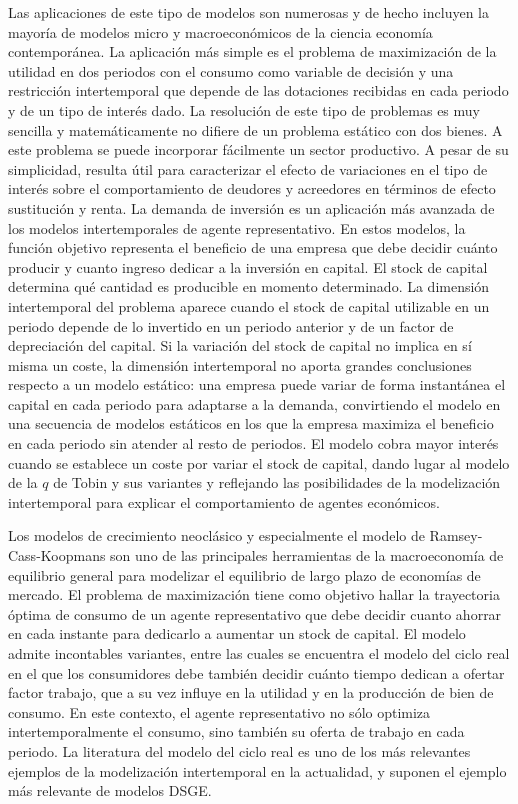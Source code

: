 \documentclass{nuevotema}
\begin{document}
Las aplicaciones de este tipo de modelos son numerosas y de hecho incluyen la mayoría de modelos micro y macroeconómicos de la ciencia economía contemporánea. La aplicación más simple es el problema de maximización de la utilidad en dos periodos con el consumo como variable de decisión y una restricción intertemporal que depende de las dotaciones recibidas en cada periodo y de un tipo de interés dado. La resolución de este tipo de problemas es muy sencilla y matemáticamente no difiere de un problema estático con dos bienes. A este problema se puede incorporar fácilmente un sector productivo. A pesar de su simplicidad, resulta útil para caracterizar el efecto de variaciones en el tipo de interés sobre el comportamiento de deudores y acreedores en términos de efecto sustitución y renta. La demanda de inversión es un aplicación más avanzada de los modelos intertemporales de agente representativo. En estos modelos, la función objetivo representa el beneficio de una empresa que debe decidir cuánto producir y cuanto ingreso dedicar a la inversión en capital. El stock de capital determina qué cantidad es producible en momento determinado. La dimensión intertemporal del problema aparece cuando el stock de capital utilizable en un periodo depende de lo invertido en un periodo anterior y de un factor de depreciación del capital. Si la variación del stock de capital no implica en sí misma un coste, la dimensión intertemporal no aporta grandes conclusiones respecto a un modelo estático: una empresa puede variar de forma instantánea el capital en cada periodo para adaptarse a la demanda, convirtiendo el modelo en una secuencia de modelos estáticos en los que la empresa maximiza el beneficio en cada periodo sin atender al resto de periodos. El modelo cobra mayor interés cuando se establece un coste por variar el stock de capital, dando lugar al modelo de la $q$ de Tobin y sus variantes y reflejando las posibilidades de la modelización intertemporal para explicar el comportamiento de agentes económicos. 

Los modelos de crecimiento neoclásico y especialmente el modelo de Ramsey-Cass-Koopmans son uno de las principales herramientas de la macroeconomía de equilibrio general para modelizar el equilibrio de largo plazo de economías de mercado. El problema de maximización tiene como objetivo hallar la trayectoria óptima de consumo de un agente representativo que debe decidir cuanto ahorrar en cada instante para dedicarlo a aumentar un stock de capital. El modelo admite incontables variantes, entre las cuales se encuentra el modelo del ciclo real en el que los consumidores debe también decidir cuánto tiempo dedican a ofertar factor trabajo, que a su vez influye en la utilidad y en la producción de bien de consumo. En este contexto, el agente representativo no sólo optimiza intertemporalmente el consumo, sino también su oferta de trabajo en cada periodo. La literatura del modelo del ciclo real es uno de los más relevantes ejemplos de la modelización intertemporal en la actualidad, y suponen el ejemplo más relevante de modelos DSGE.
\end{document}
